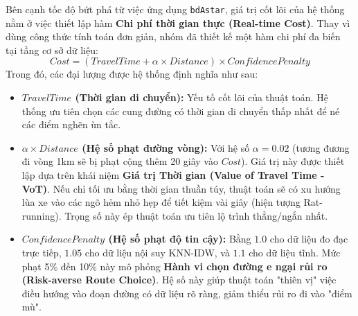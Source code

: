 Bên cạnh tốc độ bứt phá từ việc ứng dụng \texttt{bdAstar}, giá trị cốt lõi của hệ thống nằm ở việc thiết lập hàm \textbf{Chi phí thời gian thực (Real-time Cost)}. Thay vì dùng công thức tính toán đơn giản, nhóm đã thiết kế một hàm chi phí đa biến tại tầng cơ sở dữ liệu:
\begin{equation}
    Cost = (TravelTime + \alpha \times Distance) \times ConfidencePenalty
\end{equation}
Trong đó, các đại lượng được hệ thống định nghĩa như sau:
\begin{itemize}
    \item \textbf{$TravelTime$ (Thời gian di chuyển):} Yếu tố cốt lõi của thuật toán. Hệ thống ưu tiên chọn các cung đường có thời gian di chuyển thấp nhất để né các điểm nghẽn ùn tắc.
    \item \textbf{$\alpha \times Distance$ (Hệ số phạt đường vòng):} Với hệ số $\alpha = 0.02$ (tương đương đi vòng 1km sẽ bị phạt cộng thêm 20 giây vào $Cost$). Giá trị này được thiết lập dựa trên khái niệm \textbf{Giá trị Thời gian (Value of Travel Time - VoT)}. Nếu chỉ tối ưu bằng thời gian thuần túy, thuật toán sẽ có xu hướng lùa xe vào các ngõ hẻm nhỏ hẹp để tiết kiệm vài giây (hiện tượng Rat-running). Trọng số này ép thuật toán ưu tiên lộ trình thẳng/ngắn nhất.
    \item \textbf{$ConfidencePenalty$ (Hệ số phạt độ tin cậy):} Bằng $1.0$ cho dữ liệu đo đạc trực tiếp, $1.05$ cho dữ liệu nội suy KNN-IDW, và $1.1$ cho dữ liệu tĩnh. Mức phạt 5\% đến 10\% này mô phỏng \textbf{Hành vi chọn đường e ngại rủi ro (Risk-averse Route Choice)}. Hệ số này giúp thuật toán "thiên vị" việc điều hướng vào đoạn đường có dữ liệu rõ ràng, giảm thiểu rủi ro đi vào "điểm mù".
\end{itemize}

